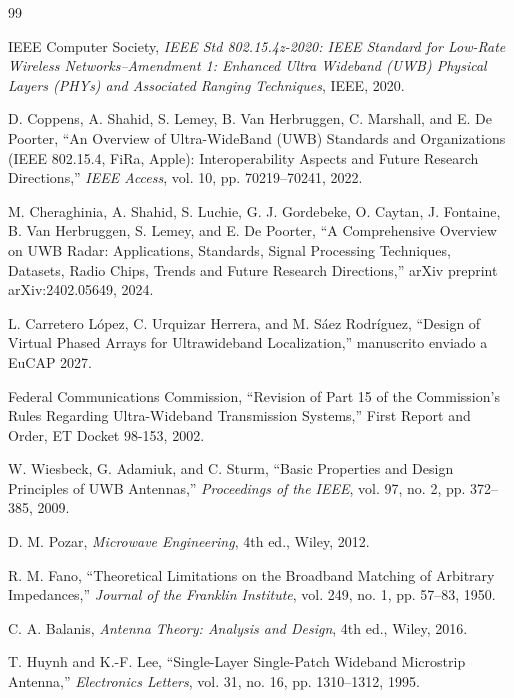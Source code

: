 \documentclass[11pt,a4paper]{article}
\begin{document}
\newpage
\begin{thebibliography}{99}
IEEE Computer Society, \textit{IEEE Std 802.15.4z-2020: IEEE Standard for Low-Rate Wireless Networks--Amendment 1: Enhanced Ultra Wideband (UWB) Physical Layers (PHYs) and Associated Ranging Techniques}, IEEE, 2020.

D. Coppens, A. Shahid, S. Lemey, B. Van Herbruggen, C. Marshall, and E. De Poorter, ``An Overview of Ultra-WideBand (UWB) Standards and Organizations (IEEE 802.15.4, FiRa, Apple): Interoperability Aspects and Future Research Directions,'' \textit{IEEE Access}, vol. 10, pp. 70219--70241, 2022.

M. Cheraghinia, A. Shahid, S. Luchie, G. J. Gordebeke, O. Caytan, J. Fontaine, B. Van Herbruggen, S. Lemey, and E. De Poorter, ``A Comprehensive Overview on UWB Radar: Applications, Standards, Signal Processing Techniques, Datasets, Radio Chips, Trends and Future Research Directions,'' arXiv preprint arXiv:2402.05649, 2024.

L. Carretero López, C. Urquizar Herrera, and M. Sáez Rodríguez, ``Design of Virtual Phased Arrays for Ultrawideband Localization,'' manuscrito enviado a EuCAP 2027.

Federal Communications Commission, ``Revision of Part 15 of the Commission's Rules Regarding Ultra-Wideband Transmission Systems,'' First Report and Order, ET Docket 98-153, 2002.

W. Wiesbeck, G. Adamiuk, and C. Sturm, ``Basic Properties and Design Principles of UWB Antennas,'' \textit{Proceedings of the IEEE}, vol. 97, no. 2, pp. 372--385, 2009.

D. M. Pozar, \textit{Microwave Engineering}, 4th ed., Wiley, 2012.

R. M. Fano, ``Theoretical Limitations on the Broadband Matching of Arbitrary Impedances,'' \textit{Journal of the Franklin Institute}, vol. 249, no. 1, pp. 57--83, 1950.

C. A. Balanis, \textit{Antenna Theory: Analysis and Design}, 4th ed., Wiley, 2016.

T. Huynh and K.-F. Lee, ``Single-Layer Single-Patch Wideband Microstrip Antenna,'' \textit{Electronics Letters}, vol. 31, no. 16, pp. 1310--1312, 1995.


\end{thebibliography}
\end{document}
